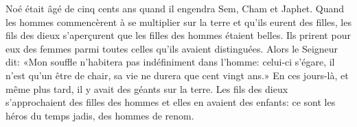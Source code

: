 Noé était âgé de cinq cents ans quand il engendra Sem, Cham et Japhet.
Quand les hommes commencèrent à se multiplier sur la terre
	et qu’ils eurent des filles,
	les fils des dieux s’aperçurent que les filles des hommes étaient belles.
	Ils prirent pour eux des femmes parmi toutes celles qu’ils avaient distinguées.
Alors le Seigneur dit:
	«Mon souffle n’habitera pas indéfiniment dans l’homme:
	celui-ci s’égare, il n’est qu’un être de chair,
	sa vie ne durera que cent vingt ans.»
En ces jours-là, et même plus tard, il y avait des géants sur la terre.
Les fils des dieux s’approchaient des filles des hommes et elles en avaient des enfants:
	ce sont les héros du temps jadis, des hommes de renom.
